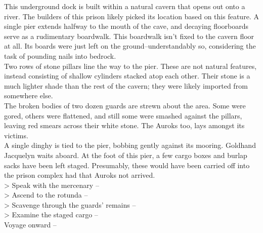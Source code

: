 This underground dock is built within a natural cavern that opens out onto a river. The builders of this prison likely picked its location based on this feature. A single pier extends halfway to the mouth of the cave, and decaying floorboards serve as a rudimentary boardwalk. This boardwalk isn’t fixed to the cavern floor at all. Its boards were just left on the ground--understandably so, considering the task of pounding nails into bedrock.\\

Two rows of stone pillars line the way to the pier. These are not natural features, instead consisting of shallow cylinders stacked atop each other. Their stone is a much lighter shade than the rest of the cavern; they were likely imported from somewhere else.\\

The broken bodies of two dozen guards are strewn about the area. Some were gored, others were flattened, and still some were smashed against the pillars, leaving red smears across their white stone. The Auroks too, lays amongst its victims.\\

A single dinghy is tied to the pier, bobbing gently against its mooring. Goldhand Jacquelyn waits aboard. At the foot of this pier, a few cargo boxes and burlap sacks have been left staged. Presumably, these would have been carried off into the prison complex had that Auroks not arrived.\\

> Speak with the mercenary -- \\
> Ascend to the rotunda -- \\
> Scavenge through the guards’ remains -- \\
> Examine the staged cargo -- \\
 Voyage onward -- 